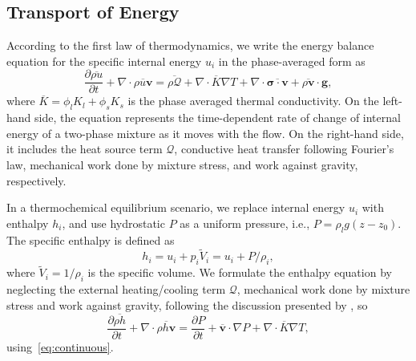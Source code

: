 \subsection{Transport of Energy}
According to the first law of thermodynamics,
we write the energy balance equation for the specific internal 
energy $u_i$ in the phase-averaged form as
\begin{equation}\label{eq:energybalanceinternalenergy}
\frac{\partial \overline{\rho u}}{\partial t} + \nabla \cdot \overline{\rho u \mathbf{v}} = 
		  \overline{\rho \mathcal{Q}} + \nabla \cdot \overline{K} \nabla T + \nabla \cdot \overline{\pmb{\sigma} \cdot \mathbf{v}} +
		  \overline{\rho \mathbf{v}} \cdot \mathbf{g},
\end{equation}
where $\overline{K} = \phi_l K_l + \phi_s K_s$ is the phase averaged thermal conductivity.
On the left-hand side, the equation represents the time-dependent rate of change 
of internal energy of a two-phase mixture as it moves with the flow.
On the right-hand side, it includes the heat source term $\mathcal{Q}$, 
conductive heat transfer following Fourier's law,
mechanical work done by mixture stress, and work against gravity, respectively.

In a thermochemical equilibrium scenario, we replace internal energy $u_i$ with 
enthalpy $h_i$, and use hydrostatic $P$ as a uniform pressure, i.e., $P = \rho_l g(z-z_0)$.
The specific enthalpy is defined as
\begin{equation}\label{eq:specificenthalpy}
		  h_i = u_i + p_i\tilde{V}_i = u_i + P/\rho_i,
\end{equation}
where $\tilde{V}_i = 1/\rho_i$ is the specific volume.
We formulate the enthalpy equation by neglecting the
external heating/cooling term $\mathcal{Q}$, mechanical work done by mixture
stress and work against gravity,
following the discussion presented by \citet{MagmaDynamicsEnthalpyMethod}, so
\begin{equation}\label{eq:enthalpyequation}
\frac{\partial \overline{\rho h}}{\partial t} + \nabla \cdot \overline{\rho h \mathbf{v}}
= \frac{\partial P}{ \partial t} + \overline{\mathbf{v}} \cdot \nabla P + 
\nabla \cdot \overline{K}\nabla T,
\end{equation}
using~\eqref{eq:continuous}.

